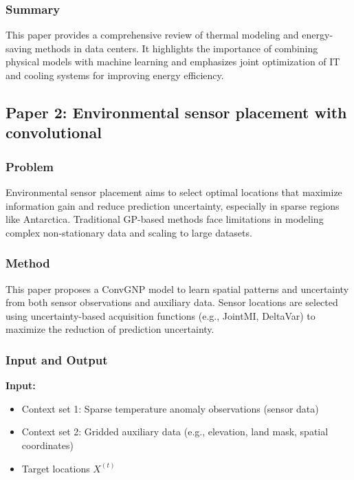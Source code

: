 \documentclass[12pt,a4paper]{article}
\begin{document}
        \subsubsection{\textbf{Summary}}

                This paper provides a comprehensive review of thermal modeling and energy-saving methods in data centers. It highlights the importance of combining physical models with machine learning and emphasizes joint optimization of IT and cooling systems for improving energy efficiency.
\newpage

\subsection{Paper 2: Environmental sensor placement with convolutional }

    \subsubsection{ Problem}
    Environmental sensor placement aims to select optimal locations that maximize information gain and reduce prediction uncertainty, especially in sparse regions like Antarctica. Traditional GP-based methods face limitations in modeling complex non-stationary data and scaling to large datasets.


    \subsubsection{Method}

    This paper proposes a ConvGNP model to learn spatial patterns and uncertainty from both sensor observations and auxiliary data. Sensor locations are selected using uncertainty-based acquisition functions (e.g., JointMI, DeltaVar) to maximize the reduction of prediction uncertainty.

    \subsubsection{ Input and Output}

                \textbf{Input:}
                \begin{itemize}
                    \item Context set 1: Sparse temperature anomaly observations (sensor data)
                    \item Context set 2: Gridded auxiliary data (e.g., elevation, land mask, spatial coordinates)
                    \item Target locations $X^{(t)}$
                \end{itemize}
            
\end{document}
